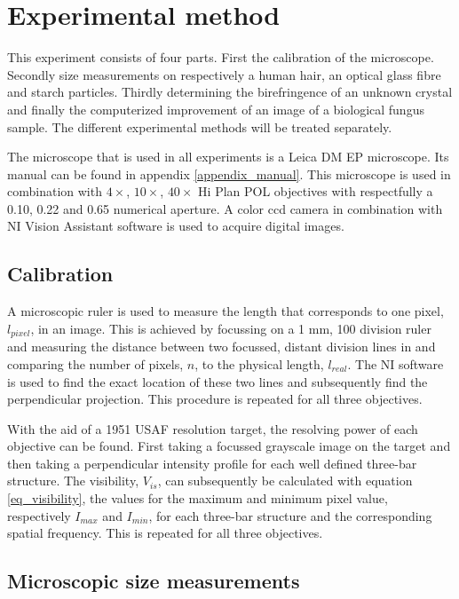 \section{Experimental method}

This experiment consists of four parts. First the calibration of the microscope. Secondly size measurements on respectively a human hair, an optical glass fibre and starch particles. Thirdly determining the birefringence of an unknown crystal and finally the computerized improvement of an image of a biological fungus sample. The different experimental methods will be treated separately. 

The microscope that is used in all experiments is a Leica DM EP microscope. Its manual can be found in appendix \ref{appendix_manual}. This microscope is used in combination with $4\times$, $10\times$, $40\times$ Hi Plan POL objectives with respectfully a 0.10, 0.22 and 0.65 numerical aperture. A color ccd camera in combination with NI Vision Assistant software is used to acquire digital images.

\subsection{Calibration}
A microscopic ruler is used to measure the length that corresponds to one pixel, $l_{pixel}$, in an image. This is achieved by focussing on a 1 mm, 100 division ruler and measuring the distance between two focussed, distant division lines in and comparing the number of pixels, $n$, to the physical length, $l_{real}$. The NI software is used to find the exact location of these two lines and subsequently find the perpendicular projection. This procedure is repeated for all three objectives.

With the aid of a 1951 USAF resolution target, the resolving power of each objective can be found. First taking a focussed grayscale image  on the target and then taking a perpendicular intensity profile for each well defined three-bar structure. The visibility, $V_{is}$, can subsequently be calculated with equation \ref{eq_visibility}, the values for the maximum and minimum pixel value, respectively $I_{max}$ and $I_{min}$, for each three-bar structure and the corresponding spatial frequency. This is repeated for all three objectives.

\subsection{Microscopic size measurements}

